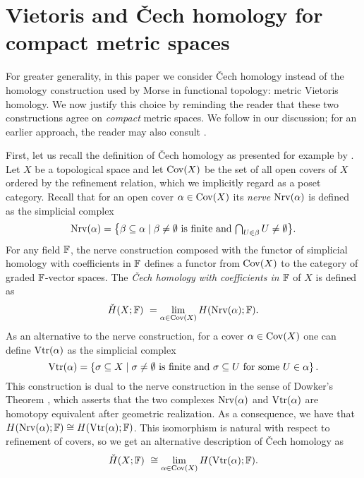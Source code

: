 
\section{Vietoris and \texorpdfstring{\v{C}}{}ech homology for compact metric spaces} \label{s:vietoris}

For greater generality, in this paper we consider \v{C}ech homology instead of the homology construction used by Morse in functional topology: metric Vietoris homology.
We now justify this choice by reminding the reader that these two constructions agree on \emph{compact} metric spaces.
We follow \cite{Dowker.1952} in our discussion; for an earlier approach, the reader may also consult \cite[Section VII.6]{Lefschetz.1942}.

First, let us recall the definition of \v{C}ech homology as presented for example by \cite[Section~IX--X]{Eilenberg.1952}.
Let $X$ be a topological space and let $\operatorname{Cov}(X)$ be the set of all open covers of $X$ ordered by the refinement relation, which we implicitly regard as a poset category.
Recall that for an open cover $\alpha \in \operatorname{Cov}(X)$ its \emph{nerve} $\operatorname{Nrv}(\alpha)$ is defined as the simplicial complex
\begin{equation*}
\operatorname{Nrv}(\alpha) =
\big\{ \beta \subseteq \alpha \mid \beta \neq \emptyset \text{ is finite and } \textstyle{\bigcap_{U \in \beta}} \, U \neq \emptyset \big\}.
\end{equation*}
For any field $\mathbb{F}$, the nerve construction composed with the functor of simplicial homology with coefficients in $\mathbb{F}$ defines a functor from $\operatorname{Cov}(X)$ to the category of graded $\mathbb{F}$-vector spaces.
The \emph{\v{C}ech homology with coefficients in $\mathbb{F}$} of $X$ is defined as
\begin{equation*}
\check{H}(X; \mathbb{F}) \ =
\lim_{\alpha \in \operatorname{Cov}(X)} H(\operatorname{Nrv}(\alpha); \mathbb{F}).
\end{equation*}
As an alternative to the nerve construction, for a cover $\alpha \in \operatorname{Cov}(X)$ one can define $\operatorname{Vtr}(\alpha)$ as the simplicial complex
\begin{equation*}
\operatorname{Vtr} (\alpha) = \left\{ \sigma \subseteq X \mid \sigma \neq \emptyset \text{ is finite and } \sigma \subseteq U \text{ for some } U \in \alpha \right\}.
\end{equation*}
This construction is dual to the nerve construction in the sense of Dowker's Theorem \cite{Dowker.1952}, which asserts that the two complexes $\operatorname{Nrv} (\alpha)$ and $\operatorname{Vtr} (\alpha)$ are homotopy equivalent after geometric realization.
As a consequence, we have that $H (\operatorname{Nrv} (\alpha); \mathbb{F}) \cong H (\operatorname{Vtr} (\alpha); \mathbb{F})$.
This isomorphism is natural with respect to refinement of covers, so we get an alternative description of \v{C}ech homology as
\begin{equation*}
\check{H} (X; \mathbb{F}) \ \cong
\lim_{\alpha \in \operatorname{Cov} (X)} H (\operatorname{Vtr} (\alpha); \mathbb{F}).
\end{equation*}

